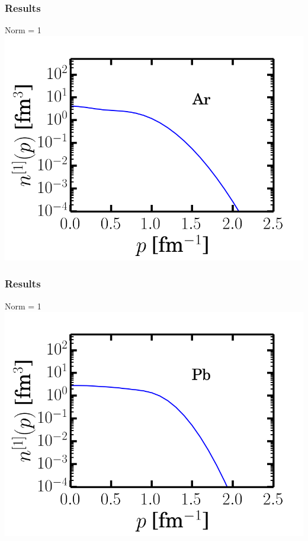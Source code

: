\documentclass{beamer}
\begin{document}
\begin{frame}
\frametitle{Results}
Norm = 1
\includegraphics[scale=0.5]{Ar_mymf.png} 
\end{frame}

\begin{frame}
\frametitle{Results}
Norm = 1
\includegraphics[scale=0.5]{Pb_mymf.png} 
\end{frame}
\end{document}
